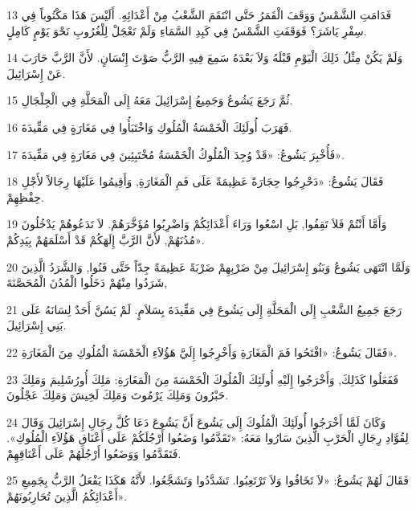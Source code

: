 \par 13 فَدَامَتِ الشَّمْسُ وَوَقَفَ الْقَمَرُ حَتَّى انْتَقَمَ الشَّعْبُ مِنْ أَعْدَائِهِ. أَلَيْسَ هَذَا مَكْتُوباً فِي سِفْرِ يَاشَرَ؟ فَوَقَفَتِ الشَّمْسُ فِي كَبِدِ السَّمَاءِ وَلَمْ تَعْجَلْ لِلْغُرُوبِ نَحْوَ يَوْمٍ كَامِلٍ.
\par 14 وَلَمْ يَكُنْ مِثْلُ ذَلِكَ الْيَوْمِ قَبْلَهُ وَلاَ بَعْدَهُ سَمِعَ فِيهِ الرَّبُّ صَوْتَ إِنْسَانٍ. لأَنَّ الرَّبَّ حَارَبَ عَنْ إِسْرَائِيلَ.
\par 15 ثُمَّ رَجَعَ يَشُوعُ وَجَمِيعُ إِسْرَائِيلَ مَعَهُ إِلَى الْمَحَلَّةِ فِي الْجِلْجَالِ.
\par 16 فَهَرَبَ أُولَئِكَ الْخَمْسَةُ الْمُلُوكِ وَاخْتَبَأُوا فِي مَغَارَةٍ فِي مَقِّيدَةَ.
\par 17 فَأُخْبِرَ يَشُوعُ: «قَدْ وُجِدَ الْمُلُوكُ الْخَمْسَةُ مُخْتَبِئِينَ فِي مَغَارَةٍ فِي مَقِّيدَةَ».
\par 18 فَقَالَ يَشُوعُ: «دَحْرِجُوا حِجَارَةً عَظِيمَةً عَلَى فَمِ الْمَغَارَةِ, وَأَقِيمُوا عَلَيْهَا رِجَالاً لأَجْلِ حِفْظِهِمْ.
\par 19 وَأَمَّا أَنْتُمْ فَلاَ تَقِفُوا, بَلِ اسْعُوا وَرَاءَ أَعْدَائِكُمْ وَاضْرِبُوا مُؤَخَّرَهُمْ. لاَ تَدَعُوهُمْ يَدْخُلُونَ مُدُنَهُمْ, لأَنَّ الرَّبَّ إِلَهَكُمْ قَدْ أَسْلَمَهُمْ بِيَدِكُمْ».
\par 20 وَلَمَّا انْتَهَى يَشُوعُ وَبَنُو إِسْرَائِيلَ مِنْ ضَرْبِهِمْ ضَرْبَةً عَظِيمَةً جِدّاً حَتَّى فَنُوا, وَالشَّرَدُ الَّذِينَ شَرَدُوا مِنْهُمْ دَخَلُوا الْمُدُنَ الْمُحَصَّنَةَ,
\par 21 رَجَعَ جَمِيعُ الشَّعْبِ إِلَى الْمَحَلَّةِ إِلَى يَشُوعَ فِي مَقِّيدَةَ بِسَلاَمٍ. لَمْ يَسُنَّ أَحَدٌ لِسَانَهُ عَلَى بَنِي إِسْرَائِيلَ.
\par 22 فَقَالَ يَشُوعُ: «افْتَحُوا فَمَ الْمَغَارَةِ وَأَخْرِجُوا إِلَيَّ هَؤُلاَءِ الْخَمْسَةَ الْمُلُوكِ مِنَ الْمَغَارَةِ».
\par 23 فَفَعَلُوا كَذَلِكَ, وَأَخْرَجُوا إِلَيْهِ أُولَئِكَ الْمُلُوكَ الْخَمْسَةَ مِنَ الْمَغَارَةِ: مَلِكَ أُورُشَلِيمَ وَمَلِكَ حَبْرُونَ وَمَلِكَ يَرْمُوتَ وَمَلِكَ لَخِيشَ وَمَلِكَ عَجْلُونَ.
\par 24 وَكَانَ لَمَّا أَخْرَجُوا أُولَئِكَ الْمُلُوكَ إِلَى يَشُوعَ أَنَّ يَشُوعَ دَعَا كُلَّ رِجَالِ إِسْرَائِيلَ وَقَالَ لِقُوَّادِ رِجَالِ الْحَرْبِ الَّذِينَ سَارُوا مَعَهُ: «تَقَدَّمُوا وَضَعُوا أَرْجُلَكُمْ عَلَى أَعْنَاقِ هَؤُلاَءِ الْمُلُوكِ». فَتَقَدَّمُوا وَوَضَعُوا أَرْجُلَهُمْ عَلَى أَعْنَاقِهِمْ.
\par 25 فَقَالَ لَهُمْ يَشُوعُ: «لاَ تَخَافُوا وَلاَ تَرْتَعِبُوا. تَشَدَّدُوا وَتَشَجَّعُوا. لأَنَّهُ هَكَذَا يَفْعَلُ الرَّبُّ بِجَمِيعِ أَعْدَائِكُمُ الَّذِينَ تُحَارِبُونَهُمْ».

